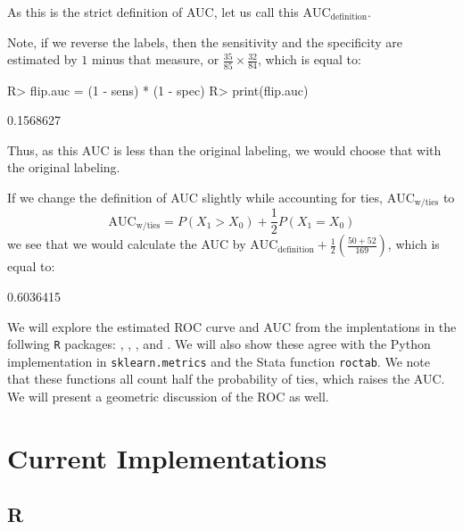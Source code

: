 \documentclass[article]{jss}
\begin{document}
As this is the strict definition of AUC, let us call this
\(\text{AUC}_{\text{definition}}\).

Note, if we reverse the labels, then the sensitivity and the specificity
are estimated by \(1\) minus that measure, or
\(\frac{35}{85} \times \frac{32}{84}\), which is equal to:

\begin{CodeChunk}

\begin{CodeInput}
R> flip.auc = (1 - sens) * (1 - spec)
R> print(flip.auc)
\end{CodeInput}

\begin{CodeOutput}
[1] 0.1568627
\end{CodeOutput}
\end{CodeChunk}

Thus, as this AUC is less than the original labeling, we would choose
that with the original labeling.

If we change the definition of AUC slightly while accounting for ties,
\(\text{AUC}_{\text{w/ties}}\) to \[
\text{AUC}_{\text{w/ties}} = P(X_{1} > X_{0}) + \frac{1}{2} P(X_{1} = X_{0})
\] we see that we would calculate the AUC by
\(\text{AUC}_{\text{definition}} + \frac{1}{2}\left( \frac{50 + 52}{169}\right)\),
which is equal to:

\begin{CodeChunk}

\begin{CodeOutput}
[1] 0.6036415
\end{CodeOutput}
\end{CodeChunk}

We will explore the estimated ROC curve and AUC from the implentations
in the follwing \texttt{R} packages:  \citep{ROCR},
,  \citep{pROC}, and  \citep{fbroc}.
We will also show these agree with the Python implementation in
\texttt{sklearn.metrics} \citep{scikitlearn} and the Stata function
\texttt{roctab}. We note that these functions all count half the
probability of ties, which raises the AUC. We will present a geometric
discussion of the ROC as well.

\hypertarget{current-implementations}{%
\section{Current Implementations}\label{current-implementations}}

\hypertarget{r}{%
\subsection{R}\label{r}}
\end{document}
